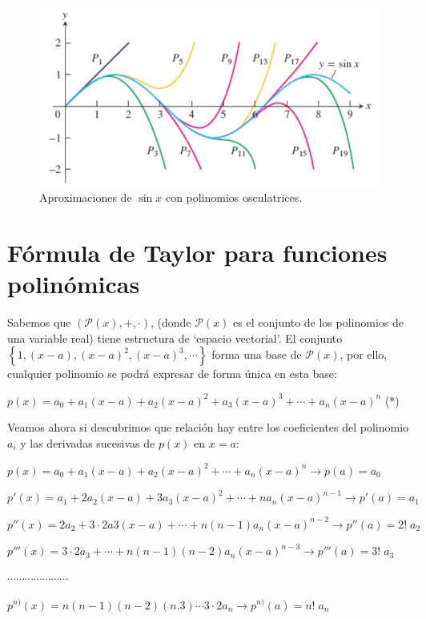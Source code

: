 	\begin{figure}[H]
		\centering
		\includegraphics[width=1\textwidth]{imagenes/imagenes06/T06IM06.png}
		\caption{Aproximaciones de $\sin x$ con polinomios osculatrices.}
	\end{figure}
	
	\section{Fórmula de Taylor para funciones polinómicas}
	
	Sabemos que $\left( \mathcal{P}(x), +, \cdot\right)$, (donde  $\mathcal{P}(x)$ es el conjunto de los polinomios de una variable real) tiene estructura de `espacio vectorial'. El conjunto $\left\{1, (x-a),(x-a)^2,(x-a)^3,\cdots \right\}$ forma una base de $\mathcal{P}(x)$, por ello, cualquier polinomio se podrá expresar de forma única en esta base:
	
	$p(x)=a_0+a_1(x-a)+a_2(x-a)^2+a_3(x-a)^3+\cdots +a_n(x-a)^n$ (*)
	
	Veamos ahora si descubrimos que relación hay entre los coeficientes del polinomio $a_i$ y las derivadas sucesivas de $p(x)$ en $x=a$:
	
	$p(x)=a_0+a_1(x-a)+a_2(x-a)^2+\cdots +a_n(x-a)^n \to p(a)=a_0$
	
	$p'(x)=a_1+2a_2(x-a)+3a_3(x-a)^2+\cdots +n a_n(x-a)^{n-1} \to p'(a)=a_1$
	
	$p''(x)=2a_2+3\cdot 2 a3 (x-a)+ \cdots + n(n-1)a_n(x-a)^{n-2} \to p''(a)=2!\; a_2$
	
	$p'''(x)=3\cdot 2 a_3+ \cdots + n(n-1)(n-2)a_n (x-a)^{n-3}\to p'''(a)=3!\; a_3$
	
	$\cdots \cdots \cdots \cdots \cdots \cdots \cdots$
	
	$p^{n)}(x)=n(n-1)(n-2)(n.3)\cdots 3\cdot 2 a_n \to p^{n)}(a)=n!\; a_n  $
	
